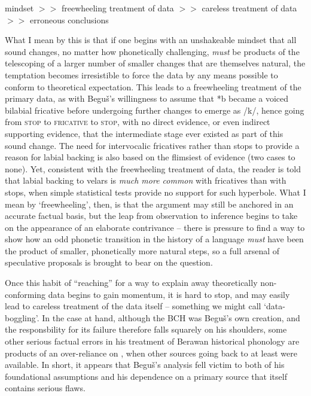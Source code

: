 \documentclass[output=paper]{langscibook}
\begin{document}
\ea
mindset   $>>$    freewheeling treatment of data    $>>$    careless treatment of data    $>>$ erroneous conclusions
\z

What I mean by this is that if one begins with an unshakeable mindset that all sound changes, no matter how phonetically challenging, \textit{must} be products of the telescoping of a larger number of smaller changes that are themselves natural, the temptation becomes irresistible to force the data by any means possible to conform to theoretical expectation. This leads to a freewheeling treatment of the primary data, as with Beguš’s willingness to assume that *b became a voiced bilabial fricative before undergoing further changes to emerge as /k/, hence going from \textsc{stop} to \textsc{fricative} to \textsc{stop}, with no direct evidence, or even indirect supporting evidence, that the intermediate stage ever existed as part of this sound change. The need for intervocalic fricatives rather than stops to provide a reason for labial backing is also based on the flimsiest of evidence (two cases to none). Yet, consistent with the freewheeling treatment of data, the reader is told that labial backing to velars is \textit{much more common} with fricatives than with stops, when simple statistical tests provide no support for such hyperbole. What I mean by ‘freewheeling’, then, is that the argument may still be anchored in an accurate factual basis, but the leap from observation to inference begins to take on the appearance of an elaborate contrivance -- there is pressure to find a way to show how an odd phonetic transition in the history of a language \textit{must} have been the product of smaller, phonetically more natural steps, so a full arsenal of speculative proposals is brought to bear on the question.

Once this habit of “reaching” for a way to explain away theoretically non-conforming data begins to gain momentum, it is hard to stop, and may easily lead to careless treatment of the data itself -- something we might call ‘data-boggling’. In the case at hand, although the BCH was Beguš’s own creation, and the responsbility for its failure therefore falls squarely on his shoulders, some other serious factual errors in his treatment of Berawan historical phonology are products of an over-reliance on \citet{Burkhardt2014}, when other sources going back to at least \citet{Blust1992} were available. In short, it appears that Beguš’s analysis fell victim to both of his foundational assumptions and his dependence on a primary source that itself contains serious flaws.
\end{document}
